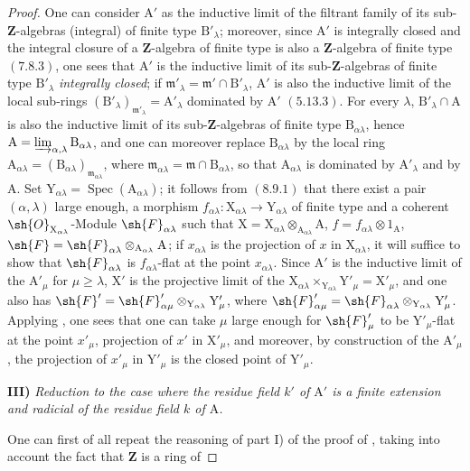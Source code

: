 \begin{proof}
\medskip
One can consider $\mathrm{A}'$ as the inductive limit of the filtrant family of its sub-$\mathbf{Z}$-algebras
(integral) of finite type $\mathrm{B}'_\lambda$; moreover, since $\mathrm{A}'$ is integrally closed and the integral
closure of a $\mathbf{Z}$-algebra of finite type is also a $\mathbf{Z}$-algebra of finite type $(7.8.3)$, one
sees that $\mathrm{A}'$ is the inductive limit of its sub-$\mathbf{Z}$-algebras of finite type $\mathrm{B}'_\lambda$ \emph{integrally closed};
if $\mathfrak{m}'_\lambda=\mathfrak{m}'\cap\mathrm{B}'_\lambda$, $\mathrm{A}'$ is also the inductive limit of the local sub-rings $(\mathrm{B}'_\lambda)_{\mathfrak{m}'_\lambda}=\mathrm{A}'_\lambda$
dominated by $\mathrm{A}'$ $(5.13.3)$. For every $\lambda$, $\mathrm{B}'_\lambda\cap\mathrm{A}$ is also the inductive limit of its sub-$\mathbf{Z}$-algebras
of finite type $\mathrm{B}_{\alpha\lambda}$, hence $\mathrm{A}=\varinjlim_{\alpha,\lambda}\mathrm{B}_{\alpha\lambda}$, and one can moreover replace $\mathrm{B}_{\alpha\lambda}$
by the local ring $\mathrm{A}_{\alpha\lambda}=(\mathrm{B}_{\alpha\lambda})_{\mathfrak{m}_{\alpha\lambda}}$, where $\mathfrak{m}_{\alpha\lambda}=\mathfrak{m}\cap\mathrm{B}_{\alpha\lambda}$, so that $\mathrm{A}_{\alpha\lambda}$ is
dominated by $\mathrm{A}'_\lambda$ and by $\mathrm{A}$. Set $\mathrm{Y}_{\alpha\lambda}=\operatorname{Spec}(\mathrm{A}_{\alpha\lambda})$; it follows from $(8.9.1)$ that there exist
a pair $(\alpha,\lambda)$ large enough, a morphism $f_{\alpha\lambda}:\mathrm{X}_{\alpha\lambda}\to\mathrm{Y}_{\alpha\lambda}$ of finite type and a
coherent $\sh{O}_{\mathrm{X}_{\alpha\lambda}}$-Module $\sh{F}_{\alpha\lambda}$ such that $\mathrm{X}=\mathrm{X}_{\alpha\lambda}\otimes_{\mathrm{A}_{\alpha\lambda}}\mathrm{A}$, $f=f_{\alpha\lambda}\otimes 1_\mathrm{A}$, $\sh{F}=\sh{F}_{\alpha\lambda}\otimes_{\mathrm{A}_{\alpha\lambda}}\mathrm{A}$; if $x_{\alpha\lambda}$
is the projection of $x$ in $\mathrm{X}_{\alpha\lambda}$, it will suffice to show that $\sh{F}_{\alpha\lambda}$ is $f_{\alpha\lambda}$-flat at the point $x_{\alpha\lambda}$.
Since $\mathrm{A}'$ is the inductive limit of the $\mathrm{A}'_\mu$ for $\mu\geq\lambda$, $\mathrm{X}'$ is the projective limit of the
$\mathrm{X}_{\alpha\lambda}\times_{\mathrm{Y}_{\alpha\lambda}}\mathrm{Y}'_\mu=\mathrm{X}'_\mu$, and one also has $\sh{F}'=\sh{F}'_{\alpha\mu}\otimes_{\mathrm{Y}_{\alpha\lambda}}\mathrm{Y}'_\mu$, where $\sh{F}'_{\alpha\mu}=\sh{F}_{\alpha\lambda}\otimes_{\mathrm{Y}_{\alpha\lambda}}\mathrm{Y}'_\mu$. Applying
, one sees that one can take $\mu$ large enough for $\sh{F}'_\mu$ to be $\mathrm{Y}'_\mu$-flat at the
point $x'_\mu$, projection of $x'$ in $\mathrm{X}'_\mu$, and moreover, by construction of the $\mathrm{A}'_\mu$, the projection
of $x'_\mu$ in $\mathrm{Y}'_\mu$ is the closed point of $\mathrm{Y}'_\mu$.

\medskip
\noindent\textbf{III)} \emph{Reduction to the case where the residue field $k'$ of $\mathrm{A}'$ is a finite extension and radicial of the
residue field $k$ of $\mathrm{A}$.}

\medskip
One can first of all repeat the reasoning of part I) of the
proof of , taking into account the fact that $\mathbf{Z}$ is a ring of
\end{proof}
